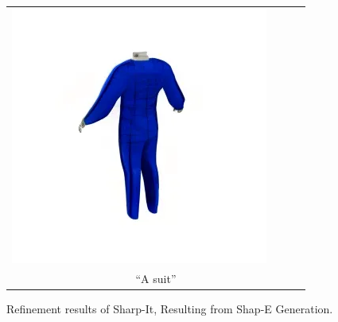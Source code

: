 \begin{figure}
{\begin{tabular}{cccc}
        \includegraphics[width=0.24\linewidth, trim=50 0 50 0, clip]{images/supplementary/failure_cases/suit-sharp-it-2.png} \\
        \multicolumn{4}{c}{``A suit''}
    \end{tabular}
    }
    \caption{Refinement results of Sharp-It, Resulting from Shap-E Generation.}
    \label{fig:supp-comparison}
\end{figure}
